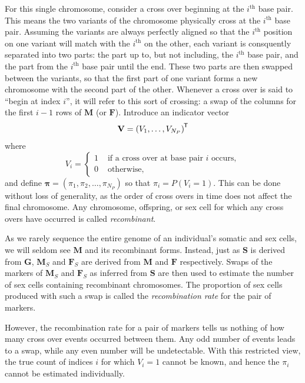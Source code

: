 \documentclass[sts]{imsart}
\newcommand{\ve}[1]{\mathbf{#1}}           %
\newcommand{\sv}[1]{\boldsymbol{#1}}   %
\newcommand{\m}[1]{\mathbf{#1}}               %
\newcommand{\tr}[1]{{#1}^{\mkern-1.5mu\mathsf{T}}}              %
\begin{document}
For this single chromosome, consider a cross over beginning at the $i^{\text{th}}$ base pair. This means the two variants of the chromosome physically cross at the $i^{\text{th}}$ base pair. Assuming the variants are always perfectly aligned so that the $i^{\text{th}}$ position on one variant will match with the $i^{\text{th}}$ on the other, each variant is consquently separated into two parts: the part up to, but not including, the $i^{\text{th}}$ base pair, and the part from the $i^{\text{th}}$ base pair until the end. These two parts are then swapped between the variants, so that the first part of one variant forms a new chromosome with the second part of the other. Whenever a cross over is said to ``begin at index $i$'', it will refer to this sort of crossing: a swap of the columns for the first $i-1$ rows of $\m{M}$ (or $\m{F}$). Introduce an indicator vector
$$\ve{V} = \tr{(V_1, \dots, V_{N_P})}$$
where
\begin{equation} \label{eq:crossindicator}
V_i = \begin{cases}
  1 & \text{ if a cross over at base pair } i \text{ occurs}, \\
  0 & \text{ otherwise},
\end{cases}
\end{equation}
and define $\sv{\pi} = (\pi_1, \pi_2, \dots, \pi_{N_P})$ so that $\pi_i = P(V_i = 1)$. This can be done without loss of generality, as the order of cross overs in time does not affect the final chromosome. Any chromosome, offspring, or sex cell for which any cross overs have occurred is called \textit{recombinant}.

As we rarely sequence the entire genome of an individual's somatic and sex cells, we will seldom see $\m{M}$ and its recombinant forms. Instead, just as $\m{S}$ is derived from $\m{G}$, $\m{M}_S$ and $\m{F}_S$ are derived from $\m{M}$ and $\m{F}$ respectively. Swaps of the markers of $\m{M}_S$ and $\m{F}_S$ as inferred from $\m{S}$ are then used to estimate the number of sex cells containing recombinant chromosomes. The proportion of sex cells produced with such a swap is called the \textit{recombination rate} for the pair of markers.

However, the recombination rate for a pair of markers tells us nothing of how many cross over events occurred between them. Any odd number of events leads to a swap, while any even number will be undetectable. With this restricted view, the true count of indices $i$ for which $V_i = 1$ cannot be known, and hence the $\pi_i$ cannot be estimated individually.
\end{document}
